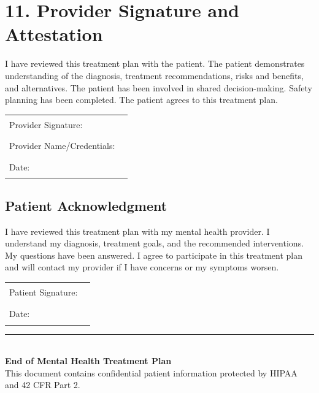 \documentclass[11pt,letterpaper]{article}
\begin{document}
\vspace{2em}

\section*{11. Provider Signature and Attestation}

I have reviewed this treatment plan with the patient. The patient demonstrates understanding of the diagnosis, treatment recommendations, risks and benefits, and alternatives. The patient has been involved in shared decision-making. Safety planning has been completed. The patient agrees to this treatment plan.

\vspace{1em}

\begin{tabular}{ll}
Provider Signature: & \rule{7cm}{0.5pt} \\[1em]
Provider Name/Credentials: & \rule{7cm}{0.5pt} \\[1em]
Date: & \rule{4cm}{0.5pt} \\[2em]
\end{tabular}

\subsection*{Patient Acknowledgment}

I have reviewed this treatment plan with my mental health provider. I understand my diagnosis, treatment goals, and the recommended interventions. My questions have been answered. I agree to participate in this treatment plan and will contact my provider if I have concerns or my symptoms worsen.

\vspace{1em}

\begin{tabular}{ll}
Patient Signature: & \rule{7cm}{0.5pt} \\[1em]
Date: & \rule{4cm}{0.5pt} \\
\end{tabular}

\vspace{2em}
\begin{center}
\rule{\textwidth}{1pt}\\
\textbf{End of Mental Health Treatment Plan}\\
This document contains confidential patient information protected by HIPAA and 42 CFR Part 2.
\end{center}
\end{document}
